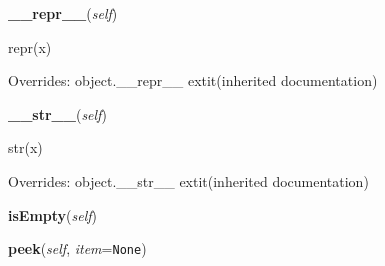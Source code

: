 \hspace{.8\funcindent}\begin{boxedminipage}{\funcwidth}

    \raggedright \textbf{\_\_repr\_\_}(\textit{self})

\setlength{\parskip}{2ex}
    repr(x)

\setlength{\parskip}{1ex}
      Overrides: object.\_\_repr\_\_ 	extit{(inherited documentation)}

    \end{boxedminipage}

    \vspace{0.5ex}

\hspace{.8\funcindent}\begin{boxedminipage}{\funcwidth}

    \raggedright \textbf{\_\_str\_\_}(\textit{self})

\setlength{\parskip}{2ex}
    str(x)

\setlength{\parskip}{1ex}
      Overrides: object.\_\_str\_\_ 	extit{(inherited documentation)}

    \end{boxedminipage}

    \label{coinor:blimpy:Stack':Stack:isEmpty}

    \vspace{0.5ex}

\hspace{.8\funcindent}\begin{boxedminipage}{\funcwidth}

    \raggedright \textbf{isEmpty}(\textit{self})

\setlength{\parskip}{2ex}
\setlength{\parskip}{1ex}
    \end{boxedminipage}

    \label{coinor:blimpy:Stack':Stack:peek}

    \vspace{0.5ex}

\hspace{.8\funcindent}\begin{boxedminipage}{\funcwidth}

    \raggedright \textbf{peek}(\textit{self}, \textit{item}={\tt None})

\setlength{\parskip}{2ex}
\setlength{\parskip}{1ex}
    \end{boxedminipage}

